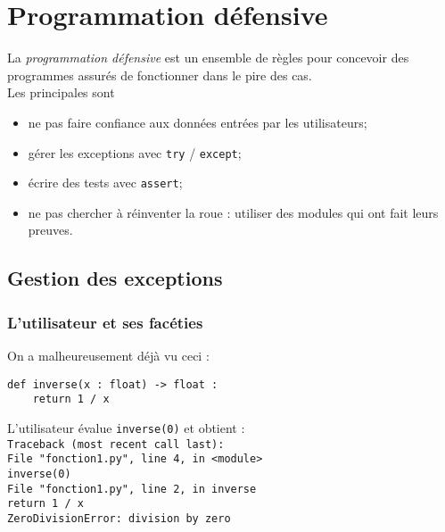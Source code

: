 \documentclass[a4paper,10pt,cours]{nsi}
\begin{document}
\chapter{Programmation défensive}

\begin{aretenir}
    La \textit{programmation défensive} est un ensemble de règles pour concevoir des programmes assurés de fonctionner dans le pire des cas.\\
    Les principales sont
    \begin{itemize}
        \item   ne pas faire confiance aux données entrées par les utilisateurs;
        \item   gérer les exceptions avec \texttt{try} / \texttt{except};
        \item   écrire des tests avec \texttt{assert};
        \item   ne pas chercher à réinventer la roue : utiliser des modules qui ont fait leurs preuves.
    \end{itemize}
\end{aretenir}


\section{Gestion des exceptions}
\subsection{L'utilisateur et ses facéties}
On a malheureusement déjà vu ceci :
\begin{pyc}
    \begin{verbatim}
def inverse(x : float) -> float :
    return 1 / x
\end{verbatim}
\end{pyc}
L'utilisateur évalue \texttt{inverse(0)} et obtient :\\

{\color{red}\texttt{Traceback (most recent call last):\\
    \hspace{2em}File "fonction1.py", line 4, in <module>\\
    \hspace{4em}inverse(0)\\
    \hspace{2em}File "fonction1.py", line 2, in inverse\\
    \hspace{4em}return 1 / x\\
    ZeroDivisionError: division by zero}}\\
\end{document}

